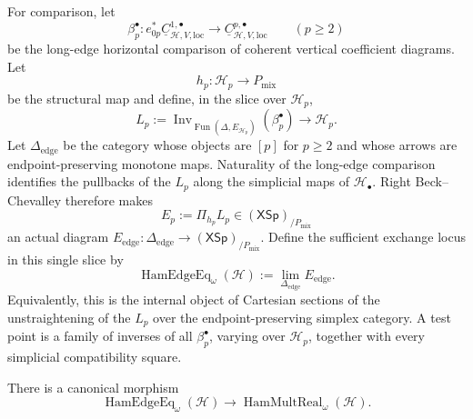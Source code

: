 For comparison, let
\[
\beta_p^\bullet:
e_{0p}^*\underline C^{1,\bullet}_{\mathcal H,V,\mathrm{loc}}
\longrightarrow
\underline C^{p,\bullet}_{\mathcal H,V,\mathrm{loc}}
\qquad (p\ge2)
\]
be the long-edge horizontal comparison of coherent vertical coefficient
diagrams.  Let
\[
h_p:\mathcal H_p\longrightarrow P_{\mathrm{mix}}
\]
be the structural map and define, in the slice over $\mathcal H_p$,
\[
L_p
:=
\operatorname{Inv}_{\operatorname{Fun}(\Delta,E_{\mathcal H_p})}
(\beta_p^\bullet)
\longrightarrow\mathcal H_p.
\]
Let $\Delta_{\mathrm{edge}}$ be the category whose objects are $[p]$ for
$p\ge2$ and whose arrows are endpoint-preserving monotone maps.  Naturality of
the long-edge comparison identifies the pullbacks of the $L_p$ along the
simplicial maps of $\mathcal H_\bullet$.  Right Beck--Chevalley therefore makes
\[
E_p:=\Pi_{h_p}L_p
\in(\mathsf{XSp})_{/P_{\mathrm{mix}}}
\]
an actual diagram
$E_{\mathrm{edge}}:\Delta_{\mathrm{edge}}\to
(\mathsf{XSp})_{/P_{\mathrm{mix}}}$.
Define the sufficient exchange locus in this single slice by
\[
\boxed{
\operatorname{HamEdgeEq}_{\omega}(\mathcal H)
:=
\lim_{\Delta_{\mathrm{edge}}}E_{\mathrm{edge}}.
}
\]
Equivalently, this is the internal object of Cartesian sections of the
unstraightening of the $L_p$ over the endpoint-preserving simplex category.  A
test point is a family of inverses of all $\beta_p^\bullet$, varying over
$\mathcal H_p$, together with every simplicial compatibility square.

\begin{proposition}
There is a canonical morphism
\[
\operatorname{HamEdgeEq}_{\omega}(\mathcal H)
\longrightarrow
\operatorname{HamMultReal}_{\omega}(\mathcal H).
\]
\end{proposition}


